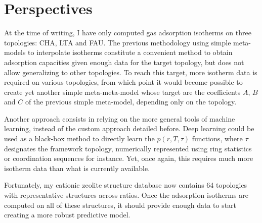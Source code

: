 \documentclass[main.tex]{subfiles}
\begin{document}
\section{Perspectives}

At the time of writing, I have only computed gas adsorption isotherms on three topologies: CHA, LTA and FAU. The previous methodology using simple meta-models to interpolate isotherms constitute a convenient method to obtain adsorption capacities given enough data for the target topology, but does not allow generalizing to other topologies. To reach this target, more isotherm data is required on various topologies, from which point it would become possible to create yet another simple meta-meta-model whose target are the coefficients $A$, $B$ and $C$ of the previous simple meta-model, depending only on the topology.

Another approach consists in relying on the more general tools of machine learning, instead of the custom approach detailed before. Deep learning could be used as a black-box method to directly learn the $p(r, T, \tau)$ functions, where $\tau$ designates the framework topology, numerically represented using ring statistics or coordination sequences for instance. Yet, once again, this requires much more isotherm data than what is currently available.

Fortunately, my cationic zeolite structure database now contains 64 topologies with representative structures across \SiAl ratios. Once the adsorption isotherms are computed on all of these structures, it should provide enough data to start creating a more robust predictive model.
\end{document}
